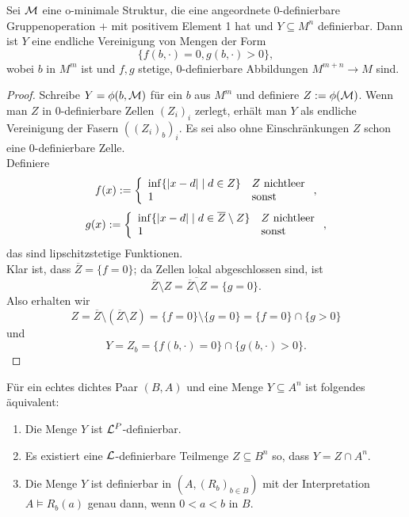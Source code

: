 \begin{lemma}
	Sei $\mathcal{M}$ eine o-minimale Struktur, die eine angeordnete 0-definierbare Gruppenoperation $+$ mit positivem Element 1 hat und $Y\subseteq M^n$ definierbar. Dann ist $Y$ eine endliche Vereinigung von Mengen der Form $$\{f(b,\cdot)=0,g(b,\cdot)>0\},$$ wobei $b$ in $M^m$ ist und $f,g$ stetige, 0-definierbare Abbildungen $M^{m+n}\rightarrow M$ sind.
\end{lemma}
\begin{proof}
	Schreibe $Y=\phi(b,\mathcal{M})$ für ein $b$ aus $M^m$ und definiere $Z:=\phi(\mathcal{M})$. Wenn man $Z$ in 0-definierbare Zellen $(Z_i)_i$ zerlegt, erhält man $Y$ als endliche Vereinigung der Fasern $((Z_i)_b)_i$.  Es sei also ohne Einschränkungen $Z$ schon eine 0-definierbare Zelle.\\
	Definiere $$f(x):=\left\{\begin{array}{ll}
	\inf\{{\left| x-d \right|}\mid d\in Z\}&Z\text{ nichtleer}\\
	1&\text{sonst}
	\end{array}\right.,$$
	$$g(x):=\left\{\begin{array}{ll}
	\inf\{{\left| x-d \right|}\mid d\in \overline{Z}\setminus Z\}&Z\text{ nichtleer}\\
	1&\text{sonst}
	\end{array}\right.,$$ das sind lipschitzstetige Funktionen.\\
	Klar ist, dass $\overline{Z}=\{f=0\}$; da Zellen lokal abgeschlossen sind, ist $$\overline{Z}\setminus Z=\overline{\overline{Z}\setminus Z}=\{g=0\}.$$ Also erhalten wir $$Z=\overline{Z}\setminus(\overline{Z}\setminus Z)=\{f=0\}\setminus\{g=0\}=\{f=0\}\cap\{g>0\}$$ und $$Y=Z_b=\{f(b,\cdot)=0\}\cap\{g(b,\cdot)>0\}.$$
\end{proof}
\newpage
\begin{theorem}\label{Definierbare Mengen}
	Für ein echtes dichtes Paar $(B,A)$ und eine Menge $Y\subseteq A^n$ ist folgendes äquivalent:
	\begin{enumerate}
		\item Die Menge $Y$ ist $\mathcal{L}^P$-definierbar.
		\item Es existiert eine $\mathcal{L}$-definierbare Teilmenge $Z\subseteq B^n$ so, dass $Y=Z\cap A^n$.
		\item Die Menge $Y$ ist definierbar in $(A,(R_b)_{b\in B})$ mit der Interpretation $A\models R_b(a)$ genau dann, wenn $0<a<b$ in $B$.
	\end{enumerate}
\end{theorem}
